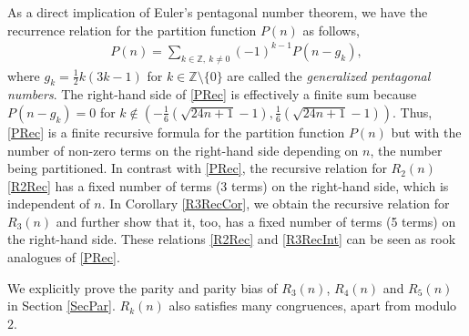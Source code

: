 \documentclass[12pt,reqno]{amsart}
\numberwithin{equation}{section}
\theoremstyle{plain}
\begin{document}
	
	As a direct implication of Euler's pentagonal number theorem, we have the recurrence relation for the partition function $P(n)$ \cite[Corollary 1.8]{AndrewsBook} as follows,  
	\begin{align}
		P(n)= \sum_{k\in \mathbb{Z},\ k\ne 0} (-1)^{k-1} P(n-g_k), \label{PRec}
	\end{align}
	where $g_k=\frac{1}{2}k(3k-1)$ for $k \in \mathbb{Z} \setminus \{0\}$ are called the \emph{generalized pentagonal numbers}. The right-hand side of \eqref{PRec} is effectively a finite sum because $P(n-g_k)=0$ for $k \notin (-\frac{1}{6}(\sqrt{24n+1}-1),\frac{1}{6}(\sqrt{24n+1}-1))$. Thus, \eqref{PRec} is a finite recursive formula for the partition function $P(n)$ but with the number of non-zero terms on the right-hand side depending on $n$, the number being partitioned. In contrast with \eqref{PRec}, the recursive relation for $R_2(n)$ \eqref{R2Rec} has a fixed number of terms (3 terms) on the right-hand side, which is independent of $n$. In Corollary \ref{R3RecCor}, we obtain the recursive relation for $R_3(n)$ and further show that it, too, has a fixed number of terms (5 terms) on the right-hand side. These relations \eqref{R2Rec} and \eqref{R3RecInt} can be seen as rook analogues of \eqref{PRec}.
	
	We explicitly prove the parity and parity bias of $R_3(n)$, $R_4(n)$ and $R_5(n)$ in Section \ref{SecPar}. $R_k(n)$ also satisfies many congruences, apart from modulo $2$. 
\end{document}
